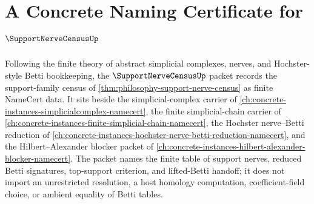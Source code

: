 \chapter{A Concrete Naming Certificate for $\SupportNerveCensusUp$}
\label{ch:concrete-instances-support-nerve-census-namecert}

Following the finite theory of abstract simplicial complexes, nerves, and Hochster-style Betti bookkeeping, the $\SupportNerveCensusUp$ packet records the support-family census of \autoref{thm:philosophy-support-nerve-census} as finite NameCert data. It sits beside the simplicial-complex carrier of \autoref{ch:concrete-instances-simplicialcomplex-namecert}, the finite simplicial-chain carrier of \autoref{ch:concrete-instances-finite-simplicial-chain-namecert}, the Hochster nerve--Betti reduction of \autoref{ch:concrete-instances-hochster-nerve-betti-reduction-namecert}, and the Hilbert--Alexander blocker packet of \autoref{ch:concrete-instances-hilbert-alexander-blocker-namecert}. The packet names the finite table of support nerves, reduced Betti signatures, top-support criterion, and lifted-Betti handoff; it does not import an unrestricted resolution, a host homology computation, coefficient-field choice, or ambient equality of Betti tables.

